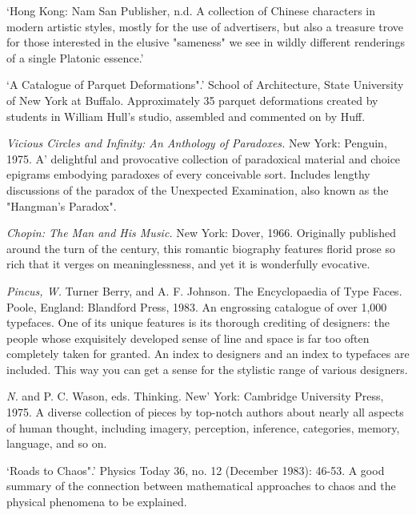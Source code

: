  `Hong Kong: Nam San Publisher, n.d. A collection of Chinese characters in modern artistic styles, mostly for the use of advertisers, but also a treasure trove for those interested in the elusive "sameness" we see in wildly different renderings of a single Platonic essence.' 

 `A Catalogue of Parquet Deformations".' School of Architecture, State University of New York at Buffalo. Approximately 35 parquet deformations created by students in William Hull's studio, assembled and commented on by Huff.

 {\sl Vicious Circles and Infinity: An Anthology of Paradoxes.} New York: Penguin, 1975. A' delightful and provocative collection of paradoxical material and choice epigrams embodying paradoxes of every conceivable sort. Includes lengthy discussions of the paradox of the Unexpected Examination, also known as the "Hangman's Paradox".

 {\sl Chopin: The Man and His Music.} New York: Dover, 1966. Originally published around the turn of the century, this romantic biography features florid prose so rich that it verges on meaninglessness, and yet it is wonderfully evocative.

 {\sl Pincus, W.} Turner Berry, and A. F. Johnson. The Encyclopaedia of Type Faces. Poole, England: Blandford Press, 1983. An engrossing catalogue of over 1,000 typefaces. One of its unique features is its thorough crediting of designers: the people whose exquisitely developed sense of line and space is far too often completely taken for granted. An index to designers and an index to typefaces are included. This way you can get a sense for the stylistic range of various designers.

 {\sl N.} and P. C. Wason, eds. Thinking. New' York: Cambridge University Press, 1975. A diverse collection of pieces by top-notch authors about nearly all aspects of human thought, including imagery, perception, inference, categories, memory, language, and so on.

 `Roads to Chaos".' Physics Today 36, no. 12 (December 1983): 46-53. A good summary of the connection between mathematical approaches to chaos and the physical phenomena to be explained.

